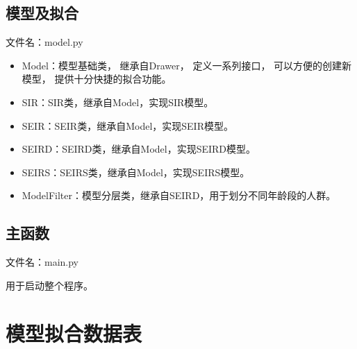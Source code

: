 \documentclass{article}
\begin{document}
\begin{appendix}
      \subsection*{模型及拟合}
      \par 文件名：model.py
      \begin{itemize}
            \item Model：模型基础类，
                  继承自Drawer，
                  定义一系列接口，
                  可以方便的创建新模型，
                  提供十分快捷的拟合功能。
            \item SIR：SIR类，继承自Model，实现SIR模型。
            \item SEIR：SEIR类，继承自Model，实现SEIR模型。
            \item SEIRD：SEIRD类，继承自Model，实现SEIRD模型。
            \item SEIRS：SEIRS类，继承自Model，实现SEIRS模型。
            \item ModelFilter：模型分层类，继承自SEIRD，用于划分不同年龄段的人群。
      \end{itemize}
      
      \subsection*{主函数}
      \par 文件名：main.py
      \par 用于启动整个程序。
      
      \section{模型拟合数据表\label{append:数据表}}
\end{appendix}
\end{document}
